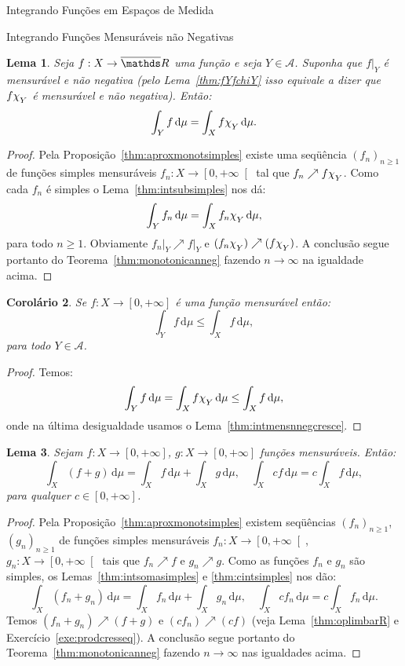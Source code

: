\documentclass[oneside,final,11pt]{amsbook}
\newcommand{\R}{\mathds R}
\newcommand{\dd}{\mathrm d}
\newcommand{\chilow}[1]{\chi_{\lower2pt\hbox{$\scriptstyle#1$}}}
\theoremstyle{remark}\newtheorem{exercise}{Exercício}[chapter]
\theoremstyle{remark}\newtheorem{*exercise}[exercise]{\hbox to 0pt{\hskip 0pt minus 1fil*}Exercício}
\theoremstyle{definition}\newtheorem{exdefin}{Definição}[chapter]
\theoremstyle{plain}\newtheorem{teo}{Teorema}[section]
\theoremstyle{plain}\newtheorem{lem}[teo]{Lema}
\theoremstyle{plain}\newtheorem{prop}[teo]{Proposição}
\theoremstyle{plain}\newtheorem{cor}[teo]{Corolário}
\theoremstyle{definition}\newtheorem{defin}[teo]{Definição}
\theoremstyle{remark}\newtheorem{rem}[teo]{Observação}
\theoremstyle{definition}\newtheorem{notation}[teo]{Notação}
\theoremstyle{definition}\newtheorem{convention}[teo]{Convenção}
\theoremstyle{definition}\newtheorem{example}[teo]{Exemplo}
\numberwithin{section}{chapter}
\numberwithin{equation}{section}
\begin{document}
\begin{chapter}{Integrando Funções em Espaços de Medida}
\begin{section}{Integrando Funções Mensuráveis não Negativas}
\begin{lem}\label{thm:vertYchiYnneg}
Seja $f:X\to\overline\R$ uma função e seja $Y\in\mathcal A$. Suponha que $f\vert_Y$
é mensurável e não negativa (pelo Lema~\ref{thm:fYfchiY} isso equivale a dizer que $f\chilow Y$ é mensurável
e não negativa). Então:
\[\int_Yf\,\dd\mu=\int_Xf\chilow Y\,\dd\mu.\]
\end{lem}
\begin{proof}
Pela Proposição~\ref{thm:aproxmonotsimples} existe uma seqüência $(f_n)_{n\ge1}$
de funções simples mensuráveis $f_n:X\to\left[0,+\infty\right[$ tal que $f_n\nearrow f\chilow Y$.
Como cada $f_n$ é simples o Lema~\ref{thm:intsubsimples} nos dá:
\[\int_Yf_n\,\dd\mu=\int_Xf_n\chilow Y\,\dd\mu,\]
para todo $n\ge1$. Obviamente $f_n\vert_Y\nearrow f\vert_Y$ e $(f_n\chilow Y)\nearrow(f\chilow Y)$.
A conclusão segue portanto do Teorema~\ref{thm:monotonicanneg} fazendo $n\to\infty$ na
igualdade acima.
\end{proof}

\begin{cor}\label{thm:cornoYdiminui}
Se $f:X\to[0,+\infty]$ é uma função mensurável então:
\[\int_Yf\,\dd\mu\le\int_Xf\,\dd\mu,\]
para todo $Y\in\mathcal A$.
\end{cor}
\begin{proof}
Temos:
\[\int_Yf\,\dd\mu=\int_Xf\chilow Y\,\dd\mu\le\int_Xf\,\dd\mu,\]
onde na última desigualdade usamos o Lema~\ref{thm:intmensnnegcresce}.
\end{proof}

\begin{lem}\label{thm:intlinearnneg}
Sejam $f:X\to[0,+\infty]$, $g:X\to[0,+\infty]$ funções mensuráveis. Então:
\[\int_X(f+g)\,\dd\mu=\int_Xf\,\dd\mu+\int_Xg\,\dd\mu,\quad\int_Xcf\,\dd\mu=c\int_Xf\,\dd\mu,\]
para qualquer $c\in[0,+\infty]$.
\end{lem}
\begin{proof}
Pela Proposição~\ref{thm:aproxmonotsimples} existem seqüências $(f_n)_{n\ge1}$, $(g_n)_{n\ge1}$
de funções simples mensuráveis $f_n:X\to\left[0,+\infty\right[$, $g_n:X\to\left[0,+\infty\right[$
tais que $f_n\nearrow f$ e $g_n\nearrow g$. Como as funções $f_n$ e $g_n$ são simples, os Lemas~\ref{thm:intsomasimples}
e \ref{thm:cintsimples} nos dão:
\[\int_X(f_n+g_n)\,\dd\mu=\int_Xf_n\,\dd\mu+\int_Xg_n\,\dd\mu,\quad\int_Xcf_n\,\dd\mu=c\int_Xf_n\,\dd\mu.\]
Temos $(f_n+g_n)\nearrow(f+g)$ e $(cf_n)\nearrow(cf)$ (veja Lema~\ref{thm:oplimbarR}
e Exercício~\ref{exe:prodcresseq}). A conclusão segue portanto
do Teorema~\ref{thm:monotonicanneg} fazendo $n\to\infty$ nas igualdades acima.
\end{proof}


\end{section}
\end{chapter}
\end{document}
